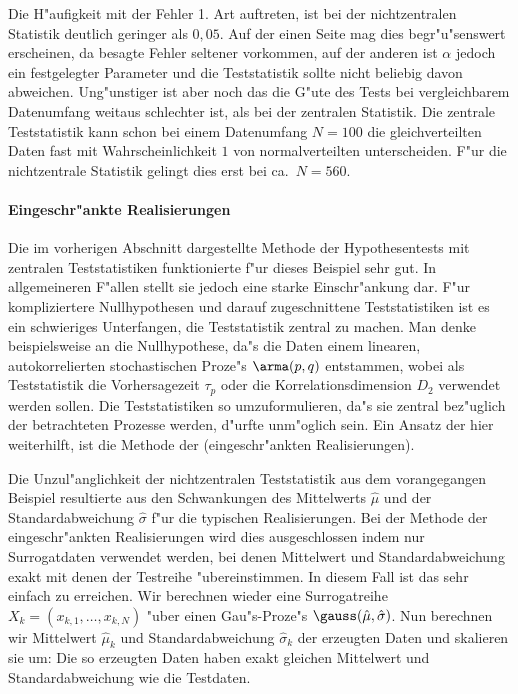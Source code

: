 Die H"aufigkeit mit der Fehler 1. Art auftreten, ist bei der nichtzentralen Statistik
deutlich geringer als $0,05$. Auf der einen Seite mag dies begr"u"senswert erscheinen, da
besagte Fehler seltener vorkommen, auf der anderen ist $\alpha$ jedoch ein festgelegter
Parameter und die Teststatistik sollte nicht beliebig davon abweichen. Ung"unstiger ist
aber noch das die G"ute des Tests bei vergleichbarem Datenumfang weitaus schlechter ist,
als bei der zentralen Statistik. Die zentrale Teststatistik kann schon bei einem
Datenumfang $N=100$ die gleichverteilten Daten fast mit Wahrscheinlichkeit $1$ von
normalverteilten unterscheiden. F"ur die nichtzentrale Statistik gelingt dies erst bei
ca.\  $N=560$.


\paragraph{Eingeschr"ankte Realisierungen}
Die im vorherigen Abschnitt dargestellte Methode der Hypothesentests mit zentralen
Teststatistiken funktionierte f"ur dieses Beispiel sehr gut. In allgemeineren F"allen
stellt sie jedoch eine starke Einschr"ankung dar. F"ur kompliziertere Nullhypothesen und
darauf zugeschnittene Teststatistiken ist es ein schwieriges Unterfangen, die
Teststatistik zentral zu machen.  Man denke beispielsweise an die Nullhypothese, da"s die
Daten einem linearen, autokorrelierten stochastischen Proze"s $\arma(p,q)$ entstammen,
wobei als Teststatistik die Vorhersagezeit $\tau_p$ oder die Korrelationsdimension $D_2$
verwendet werden sollen. Die Teststatistiken so umzuformulieren, da"s sie zentral
bez"uglich der betrachteten Prozesse werden, d"urfte unm"oglich sein. Ein Ansatz der hier
weiterhilft, ist die Methode der \begriff(eingeschr"ankten Realisierungen).

Die Unzul"anglichkeit der nichtzentralen Teststatistik aus dem vorangegangen Beispiel
resultierte aus den Schwankungen des Mittelwerts $\hat\mu$ und der Standardabweichung $\hat\sigma$ 
f"ur die typischen Realisierungen. Bei der Methode der eingeschr"ankten Realisierungen
wird dies ausgeschlossen indem nur Surrogatdaten verwendet werden, bei denen Mittelwert
und Standardabweichung exakt mit denen der Testreihe "ubereinstimmen. In diesem Fall ist
das sehr einfach zu erreichen. Wir berechnen wieder eine Surrogatreihe
$X_k=(x_{k,1},\dots,x_{k,N})$ "uber einen Gau"s-Proze"s $\gauss(\hat\mu,\hat\sigma)$. Nun
berechnen wir Mittelwert $\hat\mu_k$ und Standardabweichung $\hat\sigma_k$ der erzeugten
Daten und skalieren sie um:
Die so erzeugten Daten haben exakt gleichen Mittelwert und Standardabweichung wie die
Testdaten.

